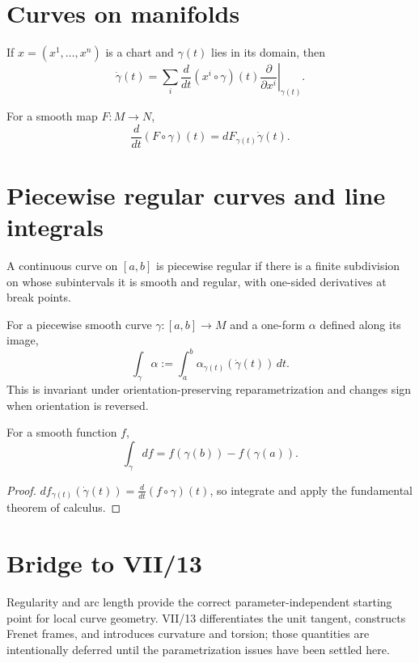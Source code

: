 \section{Curves on manifolds}
\begin{proposition}\label{prop:vii12-coordinate-velocity}
If $x=(x^1,\ldots,x^n)$ is a chart and $\gamma(t)$ lies in its domain, then
\[
\dot\gamma(t)=\sum_i\frac{d}{dt}(x^i\circ\gamma)(t)\left.\frac{\partial}{\partial x^i}\right|_{\gamma(t)}.
\]
\end{proposition}

\begin{proposition}\label{prop:vii12-map-velocity}
For a smooth map $F:M\to N$,
\[
\frac d{dt}(F\circ\gamma)(t)=dF_{\gamma(t)}\dot\gamma(t).
\]
\end{proposition}

\section{Piecewise regular curves and line integrals}
\begin{definition}\label{def:vii12-piecewise}
A continuous curve on $[a,b]$ is piecewise regular if there is a finite subdivision on whose subintervals it is smooth and regular, with one-sided derivatives at break points.
\end{definition}

\begin{definition}\label{def:vii12-line-integral}
For a piecewise smooth curve $\gamma:[a,b]\to M$ and a one-form $\alpha$ defined along its image,
\[
\int_\gamma\alpha:=\int_a^b\alpha_{\gamma(t)}(\dot\gamma(t))\,dt.
\]
This is invariant under orientation-preserving reparametrization and changes sign when orientation is reversed.
\end{definition}

\begin{proposition}\label{prop:vii12-exact-line}
For a smooth function $f$,
\[
\int_\gamma df=f(\gamma(b))-f(\gamma(a)).
\]
\end{proposition}
\begin{proof}
$df_{\gamma(t)}(\dot\gamma(t))=\frac d{dt}(f\circ\gamma)(t)$, so integrate and apply the fundamental theorem of calculus.
\end{proof}

\section*{Bridge to VII/13}
Regularity and arc length provide the correct parameter-independent starting point for local curve geometry. VII/13 differentiates the unit tangent, constructs Frenet frames, and introduces curvature and torsion; those quantities are intentionally deferred until the parametrization issues have been settled here.


